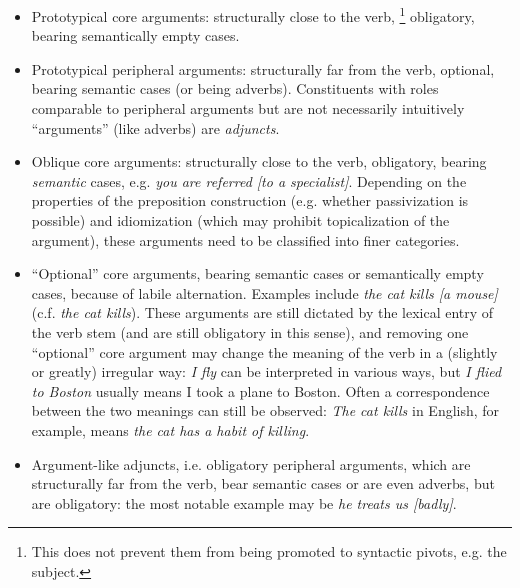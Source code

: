 \documentclass[a4paper, oneside, 12pt]{report}
\newcommand*{\term}[1]{\emph{#1}}
\newcommand{\form}[1]{\emph{#1}}
\begin{document}
\begin{table}[H]
    \caption{Classification of arguments}
    \label{tbl:argument-classification-general}
    \begin{itemize}
        \item Prototypical core arguments: 
        structurally close to the verb,%
        \footnote{
            This does not prevent them from being promoted to syntactic pivots,
            e.g. the subject.
        }
        obligatory, bearing semantically empty cases.
        \item Prototypical peripheral arguments:
        structurally far from the verb,
        optional, bearing semantic cases (or being adverbs).
        Constituents with roles comparable to peripheral arguments 
        but are not necessarily intuitively ``arguments'' (like adverbs)
        are \term{adjuncts}.
        \item Oblique core arguments:
        structurally close to the verb,
        obligatory, bearing \emph{semantic} cases,
        e.g. \form{you are referred [to a specialist]}.
        Depending on the properties of the preposition construction
        (e.g. whether passivization is possible)
        and idiomization (which may prohibit topicalization of the argument),
        these arguments need to be classified into finer categories.
        \item ``Optional'' core arguments, bearing semantic cases or semantically empty cases,
        because of labile alternation.
        Examples include \form{the cat kills [a mouse]} (c.f. \form{the cat kills}).
        These arguments are still dictated by the lexical entry of the verb stem
        (and are still obligatory in this sense),
        and removing one ``optional''  core argument
        may change the meaning of the verb in a (slightly or greatly) irregular way:
        \form{I fly} can be interpreted in various ways,
        but \form{I flied to Boston} usually means I took a plane to Boston.
        Often a correspondence between the two meanings can still be observed:
        \form{The cat kills} in English, for example, 
        means \form{the cat has a habit of killing}.
        \item Argument-like adjuncts, i.e. obligatory peripheral arguments, 
        which are structurally far from the verb,
        bear semantic cases or are even adverbs,
        but are obligatory:
        the most notable example may be \form{he treats us [badly]}.
    \end{itemize}
\end{table}
\end{document}
